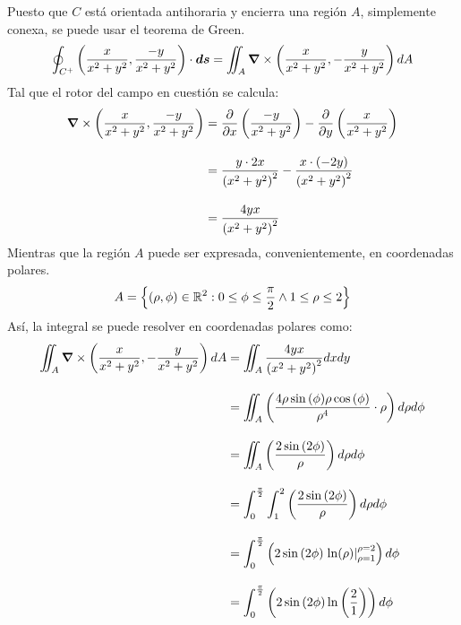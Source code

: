 \begin{solution}
\begin{figure}[H]
    \end{figure}
    Puesto que $C$ está orientada antihoraria y encierra una región $A$, simplemente conexa, se puede usar el teorema de Green.
    \begin{equation*}
        \oint_{C^+} \left(\frac{x}{x^2+y^2},\frac{-y}{x^2+y^2}\right)\cdot\boldsymbol{ds} = \iint_{A} \grad \times \left(\frac{x}{x^2+y^2},-\frac{y}{x^2+y^2}\right)dA
    \end{equation*}
    Tal que el rotor del campo en cuestión se calcula:
    \begin{align*}
        \grad \times \left(\frac{x}{x^2+y^2},\frac{-y}{x^2+y^2}\right) &= \frac{\partial}{\partial x}\left(\frac{-y}{x^2+y^2}\right) - \frac{\partial}{\partial y}\left(\frac{x}{x^2+y^2}\right)\\[10pt]
        &= \frac{y\cdot2x}{\left(x^2+y^2\right)^2} - \frac{x\cdot(-2y)}{\left(x^2+y^2\right)^2}\\[10pt]
        &= \frac{4yx}{\left(x^2+y^2\right)^2}
    \end{align*}
    Mientras que la región $A$ puede ser expresada, convenientemente, en coordenadas polares.
    \begin{equation*}
        A=\left\{(\rho,\phi)\in\mathbb{R}^2:0\leq\phi\leq\frac{\pi}{2} \land 1\leq \rho \leq 2\right\}
    \end{equation*}
    Así, la integral se puede resolver en coordenadas polares como:
    \begin{align*}
        \iint_{A} \grad \times \left(\frac{x}{x^2+y^2},-\frac{y}{x^2+y^2}\right)dA &= \iint_{A} \frac{4yx}{\left(x^2+y^2\right)^2}dxdy\\[10pt]
        &= \iint_{A}\left( \frac{4 \rho \sin{(\phi)} \rho \cos{(\phi)}}{\rho^4}\cdot \rho \right) d\rho d\phi\\[10pt]
        &= \iint_{A}\left( \frac{2 \sin{(2\phi)}}{\rho}\right) d\rho d\phi\\[10pt]
        &= \int^{\frac{\pi}{2}}_{0}\int^{2}_{1}\left( \frac{2 \sin{(2\phi)}}{\rho}\right) d\rho d\phi\\[10pt]
        &= \int^{\frac{\pi}{2}}_{0}\left(2\sin{(2\phi)}\left.\ln(\rho)\right|^{\rho=2}_{\rho=1}\right) d\phi\\[10pt]
        &= \int^{\frac{\pi}{2}}_{0}\left(2\sin{(2\phi)}\ln\left(\frac{2}{1}\right)\right) d\phi\\[10pt]

\end{align*}
\end{solution}

